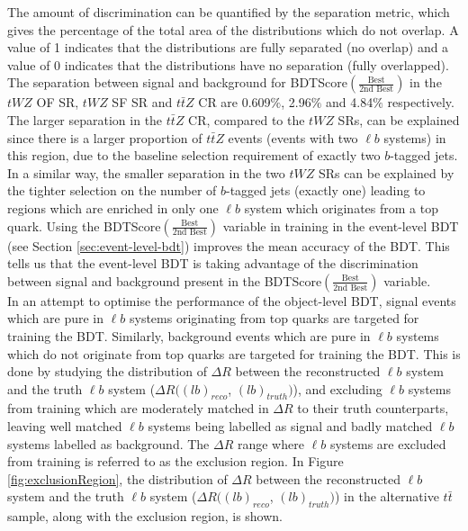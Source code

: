 The amount of discrimination can be quantified by the separation metric, which gives the percentage of the total area of the distributions which do not overlap. A value of 1 indicates that the distributions are fully separated (no overlap) and a value of 0 indicates that the distributions have no separation (fully overlapped). The separation between signal and background for BDTScore$(\frac{\text{Best}}{\text{2nd Best}})$ in the $tWZ$ OF SR, $tWZ$ SF SR and $t\bar{t}Z$ CR are 0.609$\%$, 2.96$\%$ and 4.84$\%$ respectively. The larger separation in the $t\bar{t}Z$ CR, compared to the $tWZ$ SRs, can be explained since there is a larger proportion of $t\bar{t}Z$ events (events with two $\ell b$ systems) in this region, due to the baseline selection requirement of exactly two $b$-tagged jets. In a similar way, the smaller separation in the two $tWZ$ SRs can be explained by the tighter selection on the number of $b$-tagged jets (exactly one) leading to regions which are enriched in only one $\ell b$ system which originates from a top quark. Using the BDTScore$(\frac{\text{Best}}{\text{2nd Best}})$ variable in training in the event-level BDT (see Section \ref{sec:event-level-bdt}) improves the mean accuracy of the BDT. This tells us that the event-level BDT is taking advantage of the discrimination between signal and background present in the BDTScore$(\frac{\text{Best}}{\text{2nd Best}})$ variable.\\

In an attempt to optimise the performance of the object-level BDT, signal events which are pure in $\ell b$ systems originating from top quarks are targeted for training the BDT. Similarly, background events which are pure in $\ell b$ systems which do not originate from top quarks are targeted for training the BDT. This is done by studying the distribution of $\Delta R$ between the reconstructed $\ell b$ system and the truth $\ell b$ system ($\Delta R((lb)_{reco}$, $(lb)_{truth})$), and excluding $\ell b$ systems from training which are moderately matched in $\Delta R$ to their truth counterparts, leaving well matched $\ell b$ systems being labelled as signal and badly matched $\ell b$ systems labelled as background. The $\Delta R$ range where $\ell b$ systems are excluded from training is referred to as the exclusion region. In Figure \ref{fig:exclusionRegion}, the distribution of $\Delta R$ between the reconstructed $\ell b$ system and the truth $\ell b$ system ($\Delta R((lb)_{reco}$, $(lb)_{truth})$) in the alternative $t\bar{t}$ sample, along with the exclusion region, is shown.

